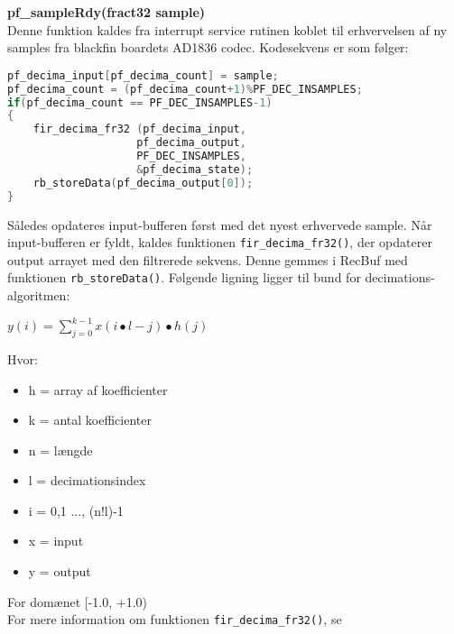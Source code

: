 \textbf{pf\_sampleRdy(fract32 sample)} \\
Denne funktion kaldes fra interrupt service rutinen koblet til erhvervelsen af ny samples fra blackfin boardets  AD1836 codec. Kodesekvens er som følger:
\begin{lstlisting}[language=C,numbers=none]
pf_decima_input[pf_decima_count] = sample;
pf_decima_count = (pf_decima_count+1)%PF_DEC_INSAMPLES;
if(pf_decima_count == PF_DEC_INSAMPLES-1)
{
	fir_decima_fr32 (pf_decima_input,
	                pf_decima_output,
	                PF_DEC_INSAMPLES,
	                &pf_decima_state);
	rb_storeData(pf_decima_output[0]);
}
\end{lstlisting}
Således opdateres input-bufferen først med det nyest erhvervede sample. Når input-bufferen er fyldt, kaldes funktionen \verb+fir_decima_fr32()+, der opdaterer output arrayet med den filtrerede sekvens. Denne gemmes i RecBuf med funktionen \verb+rb_storeData()+.
Følgende ligning ligger til bund for decimations-algoritmen:
\begin{center}
$y\left( i \right) =\sum _{ j=0 }^{ k-1 }{ x\left( i\bullet l-j \right) \bullet h\left( j \right)  } $
\end{center}
Hvor:
\begin{itemize}
	\item h = array af koefficienter
	\item k = antal koefficienter
	\item n = længde
	\item l = decimationsindex
	\item i = {0,1 ..., (n!l)-1}
	\item x = input
	\item y = output
\end{itemize}
For domænet [-1.0, +1.0) \\
For mere information om funktionen \verb+fir_decima_fr32()+, se \citep[p. 943]{C_Cpp_man_for_bf}
